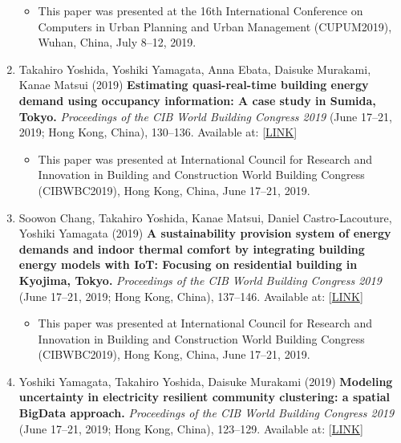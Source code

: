 \documentclass[]{book}
\providecommand{\tightlist}{%
  \setlength{\itemsep}{0pt}\setlength{\parskip}{0pt}}
\begin{document}
\begin{enumerate}
  \begin{itemize}
  \tightlist
  \item
    This paper was presented at the 16th International Conference on Computers in Urban Planning and Urban Management (CUPUM2019), Wuhan, China, July 8--12, 2019.
  \end{itemize}
\item
  Takahiro Yoshida, Yoshiki Yamagata, Anna Ebata, Daisuke Murakami, Kanae Matsui (2019)
  \textbf{Estimating quasi-real-time building energy demand using occupancy information: A case study in Sumida, Tokyo.}
  \emph{Proceedings of the CIB World Building Congress 2019} (June 17--21, 2019; Hong Kong, China), 130--136.
  Available at: {[}\href{https://site.cibworld.nl/dl/publications/WBC19/WBC_Proceedings_June2019_Complete.pdf}{LINK}{]}

  \begin{itemize}
  \tightlist
  \item
    This paper was presented at International Council for Research and Innovation in Building and Construction World Building Congress (CIBWBC2019), Hong Kong, China, June 17--21, 2019.
  \end{itemize}
\item
  Soowon Chang, Takahiro Yoshida, Kanae Matsui, Daniel Castro-Lacouture, Yoshiki Yamagata (2019)
  \textbf{A sustainability provision system of energy demands and indoor thermal comfort by integrating building energy models with IoT: Focusing on residential building in Kyojima, Tokyo.}
  \emph{Proceedings of the CIB World Building Congress 2019} (June 17--21, 2019; Hong Kong, China), 137--146.
  Available at: {[}\href{https://site.cibworld.nl/dl/publications/WBC19/WBC_Proceedings_June2019_Complete.pdf}{LINK}{]}

  \begin{itemize}
  \tightlist
  \item
    This paper was presented at International Council for Research and Innovation in Building and Construction World Building Congress (CIBWBC2019), Hong Kong, China, June 17--21, 2019.
  \end{itemize}
\item
  Yoshiki Yamagata, Takahiro Yoshida, Daisuke Murakami (2019)
  \textbf{Modeling uncertainty in electricity resilient community clustering: a spatial BigData approach.}
  \emph{Proceedings of the CIB World Building Congress 2019} (June 17--21, 2019; Hong Kong, China), 123--129.
  Available at: {[}\href{https://site.cibworld.nl/dl/publications/WBC19/WBC_Proceedings_June2019_Complete.pdf}{LINK}{]}


\end{enumerate}
\end{document}
